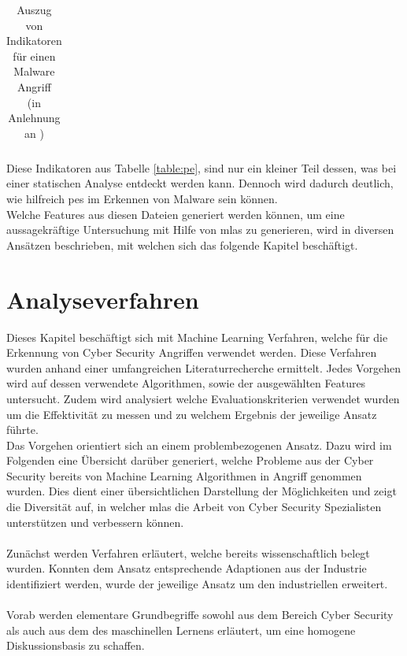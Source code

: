 \documentclass[
    12pt, %
    DIV10,
    ngerman, %
    a4paper, %
    oneside, %
    titlepage, %
    parskip=half, %
    headings=normal, %
    listof=totoc, %
    bibliography=totoc, %
    index=totoc, %
    captions=tableheading, %
    final %
]{scrreprt}
\begin{document}
\begin{table}[H]
\begin{tabular}{lll}
\end{tabular}
\caption{Auszug von Indikatoren für einen Malware Angriff\\ (in Anlehnung an \textcite{Sikorski2012})}\label{table:pe}
Diese Indikatoren aus Tabelle \ref{table:pe}, sind nur ein kleiner Teil dessen, was bei einer statischen Analyse entdeckt werden kann. Dennoch wird dadurch deutlich, wie hilfreich \ac{pes} im Erkennen von Malware sein können.\\ 
Welche Features aus diesen Dateien generiert werden können, um eine aussagekräftige Untersuchung mit Hilfe von \ac{mlas} zu generieren, wird in diversen Ansätzen beschrieben, mit welchen sich das folgende Kapitel beschäftigt.
\label{tab:iocs}
\end{table}
\chapter{Analyseverfahren}\label{sec:analyse}
\label{sec:ba}
Dieses Kapitel beschäftigt sich mit Machine Learning Verfahren, welche für die Erkennung von Cyber Security Angriffen verwendet werden. Diese Verfahren wurden anhand einer umfangreichen Literaturrecherche ermittelt. Jedes Vorgehen wird auf dessen verwendete Algorithmen, sowie der ausgewählten Features untersucht. Zudem wird analysiert welche Evaluationskriterien verwendet wurden um die Effektivität zu messen und zu welchem Ergebnis der jeweilige Ansatz führte.\\
Das Vorgehen orientiert sich an einem problembezogenen Ansatz. Dazu wird im Folgenden eine Übersicht darüber generiert, welche Probleme aus der Cyber Security bereits von Machine Learning Algorithmen in Angriff genommen wurden. Dies dient einer übersichtlichen Darstellung der Möglichkeiten und zeigt die Diversität auf, in welcher \ac{mlas} die Arbeit von Cyber Security Spezialisten unterstützen und verbessern können.\\\\
Zunächst werden Verfahren erläutert, welche bereits wissenschaftlich belegt wurden. Konnten dem Ansatz entsprechende Adaptionen aus der Industrie identifiziert werden, wurde der jeweilige Ansatz um den industriellen erweitert.
\\\\
Vorab werden elementare Grundbegriffe sowohl aus dem Bereich Cyber Security als auch aus dem des maschinellen Lernens erläutert, um eine homogene Diskussionsbasis zu schaffen.
\end{document}
